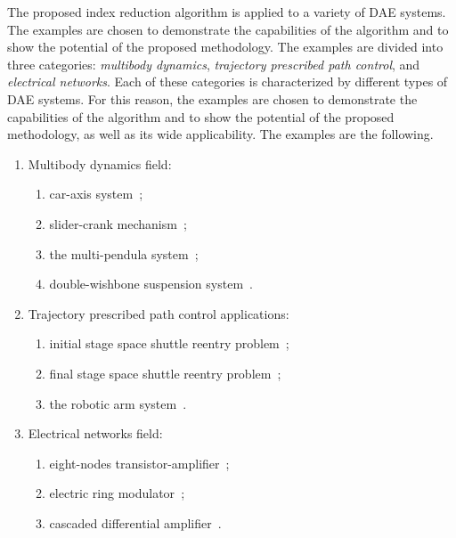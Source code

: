 The proposed index reduction algorithm is applied to a variety of \ac{DAE} systems. The examples are chosen to demonstrate the capabilities of the algorithm and to show the potential of the proposed methodology. The examples are divided into three categories: \emph{multibody dynamics}, \emph{trajectory prescribed path control}, and \emph{electrical networks}. Each of these categories is characterized by different types of \ac{DAE} systems. For this reason, the examples are chosen to demonstrate the capabilities of the algorithm and to show the potential of the proposed methodology, as well as its wide applicability. The examples are the following.
%
\begin{enumerate}
  \setlength\itemsep{0.0em}
  \item Multibody dynamics field:
  \begin{enumerate}
    \setlength\itemsep{0.0em}
    \item car-axis system~\cite{lioen1998test, mazzia2008test};
    \item slider-crank mechanism~\cite{lioen1998test, mazzia2008test};
    \item the multi-pendula system~\cite{nedialkov2008solvingIII};
    \item double-wishbone suspension system~\cite{lioen1998test, mazzia2008test}.
  \end{enumerate}
  \item Trajectory prescribed path control applications:
  \begin{enumerate}
    \setlength\itemsep{0.0em}
    \item initial stage space shuttle reentry problem~\cite{brenan1995numerical};
    \item final stage space shuttle reentry problem~\cite{brenan1995numerical};
    \item the robotic arm system~\cite{pryce1998solving}.
  \end{enumerate}
  \item Electrical networks field:
  \begin{enumerate}
    \setlength\itemsep{0.0em}
    \item eight-nodes transistor-amplifier~\cite{lioen1998test, mazzia2008test};
    \item electric ring modulator~\cite{lioen1998test, mazzia2008test};
    \item cascaded differential amplifier~\cite{brenan1995numerical}.
  \end{enumerate}
\end{enumerate}

